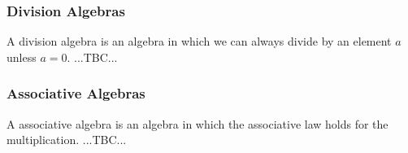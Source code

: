




\subsubsection{Division Algebras}
A division algebra is an algebra in which we can always divide by an element $a$ unless $a = 0$. ...TBC...







\subsubsection{Associative Algebras}
A associative algebra is an algebra in which the associative law holds for the multiplication. ...TBC...








